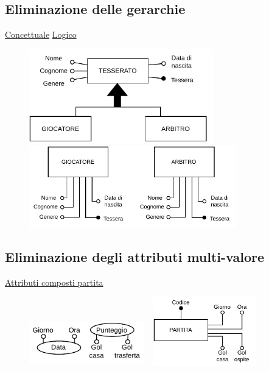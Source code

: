\documentclass[11pt, openany]{article}
\theoremstyle{definition}
\theoremstyle{plain}
\theoremstyle{remark}
\begin{document}
			\subsection{Eliminazione delle gerarchie}
				\underline{Concettuale} \hspace{7.5cm} \underline{Logico}\
				\begin{figure}[h]
					\begin{minipage}[b]{8.5cm}
						\centering
						\includegraphics[width=8cm]{./include/bdsi-prog-2023-TRAD.C1.pdf}
					\end{minipage}
					\hspace{2mm} \hspace{3mm}
					\begin{minipage}[b]{8.5cm}
						\centering
						\includegraphics[width=9cm]{./include/bdsi-prog-2023-TRAD.L1.pdf}
					\end{minipage}
				\end{figure}
			\subsection{Eliminazione degli attributi multi-valore}
				\underline{Attributi composti partita}
				\begin{figure}[h]
					\begin{minipage}[b]{8.5cm}
						\centering
						\includegraphics[width=5cm, height=2cm]{./include/bdsi-prog-2023-TRAD.C2.pdf}
					\end{minipage}
					\hspace{2mm} \hspace{3mm}
					\begin{minipage}[b]{8.5cm}
						\centering
						\includegraphics[width=5cm, height=3cm]{./include/bdsi-prog-2023-TRAD.L2.pdf}
					\end{minipage}
				\end{figure}
				
\end{document}
